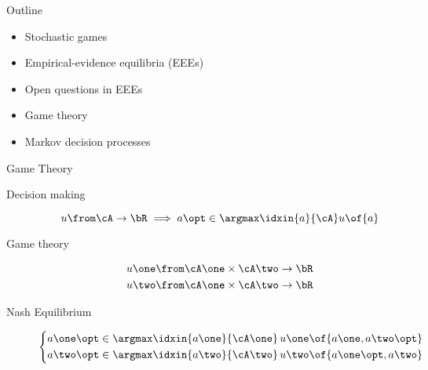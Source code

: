 \begin{frame}[plain]
  \maketitle
\end{frame}
\begin{frame}{Outline}
  \large
  \begin{itemize}
    \itemsep1cm
    \item Stochastic games
    \item Empirical-evidence equilibria (EEEs)
    \item Open questions in EEEs
  \end{itemize}
\end{frame}
\begin{frame}
  \LARGE
  \bigskip
  \large
  \begin{itemize}
     \itemsep0.5cm
     \item Game theory
     \item Markov decision processes
  \end{itemize}
\end{frame}
\begin{frame}{Game Theory}
  \begin{description}
  \item[Decision making]
    \[u \from \cA \to \bR \implies a\opt \in \argmax\idxin{a}{\cA} u \of{a}\]
  \item[Game theory]
    \begin{align*}
      u\one \from \cA\one \times \cA\two \to \bR \\
      u\two \from \cA\one \times \cA\two \to \bR
    \end{align*}
  \item[Nash Equilibrium]
    \begin{equation*}
      \left\{
      \begin{aligned}
        a\one\opt \in \argmax\idxin{a\one}{\cA\one} &\, u\one \of{a\one, a\two\opt} \\
        a\two\opt \in \argmax\idxin{a\two}{\cA\two} &\, u\two \of{a\one\opt, a\two}
      \end{aligned}
      \right.
    \end{equation*}
  \end{description}
\end{frame}

